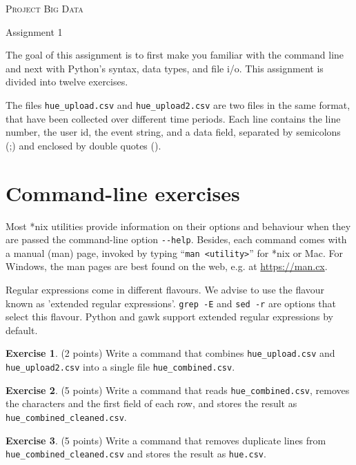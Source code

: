 \documentclass[a4paper]{report}
\theoremstyle{definition}
\newtheorem{exercise}{Exercise}
\newcommand{\blankline}{\par\vspace{5mm}}
\begin{document}
	
\begin{center}
	\textsc{\Large Project Big Data}
	\blankline
	
	{\large Assignment 1}
\end{center}

\blankline \noindent The goal of this assignment is to first make you familiar with the command line and next with Python’s syntax, data types, and file i/o. This assignment is divided into twelve exercises.

The files \texttt{hue\_upload.csv} and \texttt{hue\_upload2.csv} are two files in the same format, that have been collected over different time periods. Each line contains the line number, the user id, the event string, and a data field, separated by semicolons (;) and enclosed by double quotes (\textquotedbl{}).

\section*{Command-line exercises}
\label{command-line-exercises}

Most *nix utilities provide information on their options and behaviour when
they are passed the command-line option \texttt{-{}-help}. Besides, each
command comes with a manual (man) page, invoked by typing ``\texttt{man
<utility>}'' for
*nix or Mac. For Windows, the man pages are best found on the web, e.g.
at \url{https://man.cx}.

Regular expressions come in different flavours. We advise to use the flavour
known as 'extended regular expressions'. \texttt{grep -E} and \texttt{sed -r}
are options that select this flavour. Python and gawk support extended regular
expressions by default.

\begin{exercise}
	(2 points) Write a command that combines \texttt{hue\_upload.csv} and \texttt{hue\_upload2.csv} into a single file \texttt{hue\_combined.csv}.
\end{exercise}

\begin{exercise}
	(5 points) Write a command that reads \texttt{hue\_combined.csv}, removes the \textquotedbl{} characters and the first field of each row, and stores the result as \texttt{hue\_combined\_cleaned.csv}.
\end{exercise}

\begin{exercise}
	(5 points) Write a command that removes duplicate lines from \texttt{hue\_combined\_cleaned.csv} and stores the result as \texttt{hue.csv}.
\end{exercise}
\end{document}
